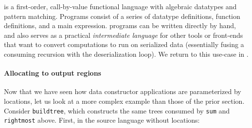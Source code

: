 \documentclass[showabstract,showacknowledgments,showpreface,showdedication]{iuphd}
\begin{document}
\ourcalc{} is a first-order,
call-by-value functional language with algebraic datatypes and pattern
matching. Programs consist of a series of datatype definitions, function
definitions, and a main expression.
%
%
\ourcalc{} programs can be written directly by hand, and \ourcalc{} also serves
as a practical {\em intermediate language} for other tools or front-ends that
want to convert computations to run on serialized data (essentially fusing a
consuming recursion with the deserialization loop).
%
We return to this use-case in .

\paragraph{Allocating to output regions}
%
Now that we have seen how data constructor applications are parameterized by
locations, let us look at a more complex example than those of the prior section.
Consider \lstinline[mathescape]{buildtree}, which constructs the same trees consumed by \lstinline[mathescape]{sum}
and \lstinline[mathescape]{rightmost} above.  First, in the source language without locations:
\end{document}
